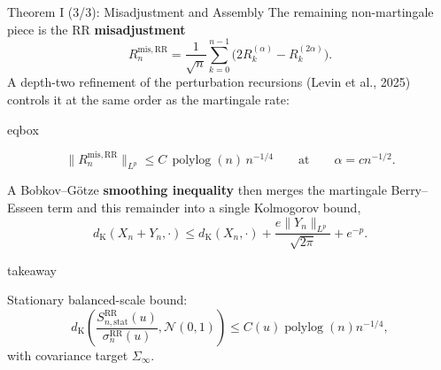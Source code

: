\documentclass[11pt,aspectratio=169,xcolor=table]{beamer}
\newcommand{\RR}{\mathrm{RR}}
\newenvironment{eqbox}
  {\begin{beamercolorbox}[wd=\linewidth,sep=0.48em,center,rounded=true]{eqbox}%
   \begin{minipage}{0.97\linewidth}\centering}
  {\end{minipage}\end{beamercolorbox}}
\newenvironment{takeawaybox}
  {\begin{beamercolorbox}[wd=\linewidth,sep=0.52em,leftskip=0.25em,rightskip=0.25em,rounded=true]{takeaway}%
   \begin{minipage}{0.96\linewidth}%
   \llap{{\color{ThesisGreen}\rule{2.5pt}{2.6ex}}\hspace{0.5em}}}
  {\end{minipage}\end{beamercolorbox}}
\begin{document}
\begin{frame}[shrink=25]{Theorem I (3/3): Misadjustment and Assembly}
\footnotesize
The remaining non-martingale piece is the RR \textbf{misadjustment}
\[
  R_n^{\mathrm{mis,RR}}
  =\frac1{\sqrt n}\sum_{k=0}^{n-1}
    \bigl(2R_k^{(\alpha)}-R_k^{(2\alpha)}\bigr).
\]
A depth-two refinement of the perturbation recursions (Levin et al., 2025)
controls it at the same order as the martingale rate:

\begin{eqbox}
\[
  \lVert R_n^{\mathrm{mis,RR}}\rVert_{L^p}
  \leq C\,\operatorname{polylog}(n)\,n^{-1/4}
  \qquad\text{at}\qquad \alpha=cn^{-1/2}.
\]
\end{eqbox}

\vspace{0.4em}
A Bobkov--Götze \textbf{smoothing inequality} then merges the martingale
Berry--Esseen term and this remainder into a single Kolmogorov bound,
\[
  d_{\mathrm K}(X_n+Y_n,\mathord{\cdot})
  \leq d_{\mathrm K}(X_n,\mathord{\cdot})
      +\frac{e\lVert Y_n\rVert_{L^p}}{\sqrt{2\pi}}+e^{-p}.
\]

\vspace{0.35em}
\begin{takeawaybox}
Stationary balanced-scale bound:
\[
  d_{\mathrm K}\!\left(
    \frac{S_{n,\mathrm{stat}}^\RR(u)}{\sigma_n^\RR(u)},
    \mathcal N(0,1)\right)
  \leq C(u)\operatorname{polylog}(n)n^{-1/4},
\]
with covariance target $\Sigma_\infty$.
\end{takeawaybox}
\end{frame}
\end{document}
